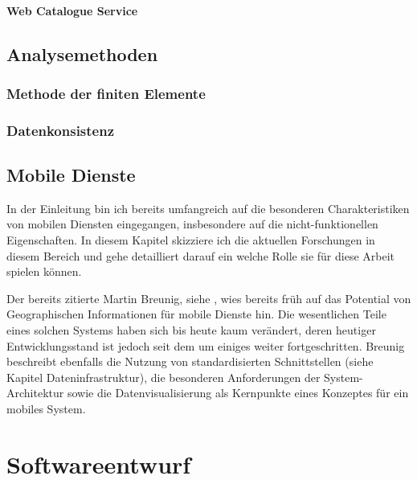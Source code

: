 \subsubsection{Web Catalogue Service}

\section{Analysemethoden}
\subsection{Methode der finiten Elemente}
\subsection{Datenkonsistenz}

\section{Mobile Dienste}
In der Einleitung bin ich bereits umfangreich auf die besonderen Charakteristiken von mobilen Diensten eingegangen, insbesondere auf die nicht-funktionellen Eigenschaften. In diesem Kapitel skizziere ich die aktuellen Forschungen in diesem Bereich und gehe detailliert darauf ein welche Rolle sie für diese Arbeit spielen können.

Der bereits zitierte Martin Breunig, siehe \citep{breunig_entwicklung_2003}, wies bereits früh auf das Potential von Geographischen Informationen für mobile Dienste hin. Die wesentlichen Teile eines solchen Systems haben sich bis heute kaum verändert, deren heutiger Entwicklungsstand ist jedoch seit dem um einiges weiter fortgeschritten. Breunig beschreibt ebenfalls die Nutzung von standardisierten Schnittstellen (siehe Kapitel Dateninfrastruktur), die besonderen Anforderungen der System-Architektur sowie die Datenvisualisierung als Kernpunkte eines Konzeptes für ein mobiles System.


\chapter{Softwareentwurf}
